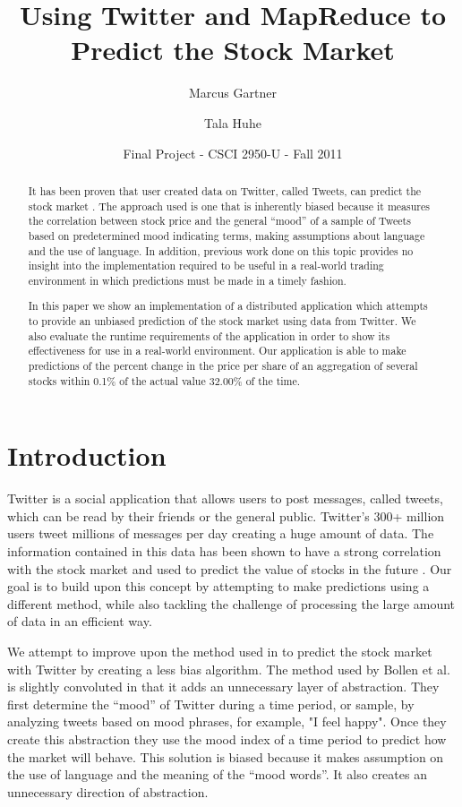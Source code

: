 \documentclass[twocolumn]{article}
\begin{document}
\title{Using Twitter and MapReduce to Predict the Stock Market}
\author{Marcus Gartner \and Tala Huhe}
\date{Final Project - CSCI 2950-U - Fall 2011}
\maketitle

\begin{abstract}
\noindent
It has been proven that user created data on Twitter, called Tweets, can predict the stock market \cite{bollen}. The approach used is one that is inherently biased because it measures the correlation between stock price and the general “mood” of a sample of Tweets based on predetermined mood indicating terms, making assumptions about language and the use of language. In addition, previous work done on this topic provides no insight into the implementation required to be useful in a real-world trading environment in which predictions must be made in a timely fashion.

In this paper we show an implementation of a distributed application which attempts to provide an unbiased prediction of the stock market using data from Twitter. We also evaluate the runtime requirements of the application in order to show its effectiveness for use in a real-world environment. Our application is able to make predictions of the percent change in the price per share of an aggregation of several stocks within 0.1\% of the actual value 32.00\% of the time.
\end{abstract}

\section{Introduction}
Twitter is a social application that allows users to post messages, called tweets, which can be read by their friends or the general public. Twitter’s 300+ million users tweet millions of messages per day creating a huge amount of data. The information contained in this data has been shown to have a strong correlation with the stock market and used to predict the value of stocks in the future \cite{bollen}. Our goal is to build upon this concept by attempting to make predictions using a different method, while also tackling the challenge of processing the large amount of data in an efficient way.

We attempt to improve upon the method used in \cite{bollen} to predict the stock market with Twitter by creating a less bias algorithm. The method used by Bollen et al. is slightly convoluted in that it adds an unnecessary layer of abstraction. They first determine the “mood” of Twitter during a time period, or sample, by analyzing tweets based on mood phrases, for example, "I feel happy". Once they create this abstraction they use the mood index of a time period to predict how the market will behave. This solution is biased because it makes assumption on the use of language and the meaning of the “mood words”. It also creates an unnecessary direction of abstraction.
\end{document}
